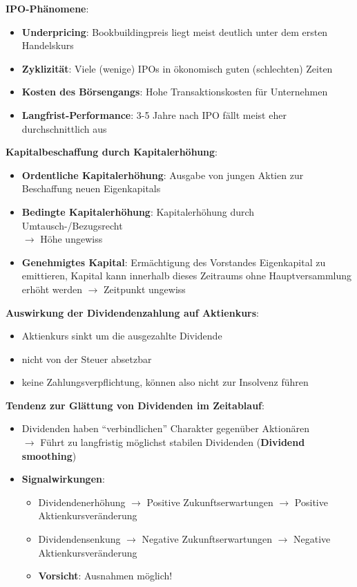 \textbf{IPO-Phänomene}:
\begin{itemize}
	\item \textbf{Underpricing}: Bookbuildingpreis liegt meist deutlich unter dem ersten Handelskurs
	\item \textbf{Zyklizität}: Viele (wenige) IPOs in ökonomisch guten (schlechten) Zeiten
	\item \textbf{Kosten des Börsengangs}: Hohe Transaktionskosten für Unternehmen
	\item \textbf{Langfrist-Performance}: 3-5 Jahre nach IPO fällt meist eher durchschnittlich aus
\end{itemize}
\bigskip
\textbf{Kapitalbeschaffung durch Kapitalerhöhung}:
\begin{itemize}
	\item \textbf{Ordentliche Kapitalerhöhung}: Ausgabe von jungen Aktien zur Beschaffung neuen Eigenkapitals
	\item \textbf{Bedingte Kapitalerhöhung}: Kapitalerhöhung durch Umtausch-/Bezugsrecht\\ $\rightarrow$ Höhe ungewiss
	\item \textbf{Genehmigtes Kapital}: Ermächtigung des Vorstandes Eigenkapital zu emittieren, Kapital kann innerhalb dieses Zeitraums ohne Hauptversammlung erhöht werden 
	$\rightarrow$ Zeitpunkt ungewiss
\end{itemize}
\bigskip
\textbf{Auswirkung der Dividendenzahlung auf Aktienkurs}:
\begin{itemize}
	\item Aktienkurs sinkt um die ausgezahlte Dividende
	\item nicht von der Steuer absetzbar
	\item keine Zahlungsverpflichtung, können also nicht zur Insolvenz führen
\end{itemize}
\bigskip
\textbf{Tendenz zur Glättung von Dividenden im Zeitablauf}:
\begin{itemize}
	\item Dividenden haben \enquote{verbindlichen} Charakter gegenüber Aktionären\\
	$\rightarrow$ Führt zu langfristig möglichst stabilen Dividenden (\textbf{Dividend smoothing})
	\item \textbf{Signalwirkungen}:
	\begin{itemize}
		\item Dividendenerhöhung $\rightarrow$ Positive Zukunftserwartungen $\rightarrow$ Positive Aktienkursveränderung
		\item Dividendensenkung $\rightarrow$ Negative Zukunftserwartungen $\rightarrow$ Negative Aktienkursveränderung
		\item \textbf{Vorsicht}: Ausnahmen möglich!
	\end{itemize}
\end{itemize}
